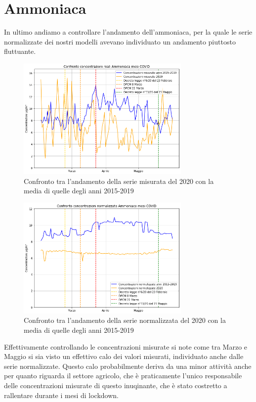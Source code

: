 \documentclass[a4paper,12pt]{report}
\begin{document}
\section{Ammoniaca}
In ultimo andiamo a controllare l'andamento dell'ammoniaca, per la quale le serie normalizzate dei nostri modelli avevano individuato un andamento piuttosto fluttuante.

\begin{figure}[h]
\centering
\includegraphics[width=0.75\textwidth]{ammoniaca_covid}
\caption{Confronto tra l'andamento della serie misurata del 2020 con la media di quelle degli anni 2015-2019}
\label{fig:ammoniaca_covid}
\end{figure}

\begin{figure}[h]
\centering
\includegraphics[width=0.75\textwidth]{ammoniaca_covid_norm}
\caption{Confronto tra l'andamento della serie normalizzata del 2020 con la media di quelle degli anni 2015-2019}
\label{fig:ammoniaca_covid_norm}
\end{figure}

Effettivamente controllando le concentrazioni misurate si note come tra Marzo e Maggio si sia visto un effettivo calo dei valori misurati, individuato anche dalle serie normalizzate.
Questo calo probabilmente deriva da una minor attività anche per quanto riguarda il settore agricolo, che è praticamente l'unico responsabile delle concentrazioni misurate di questo inuqinante, che è stato costretto a rallentare durante i mesi di lockdown.
\end{document}
